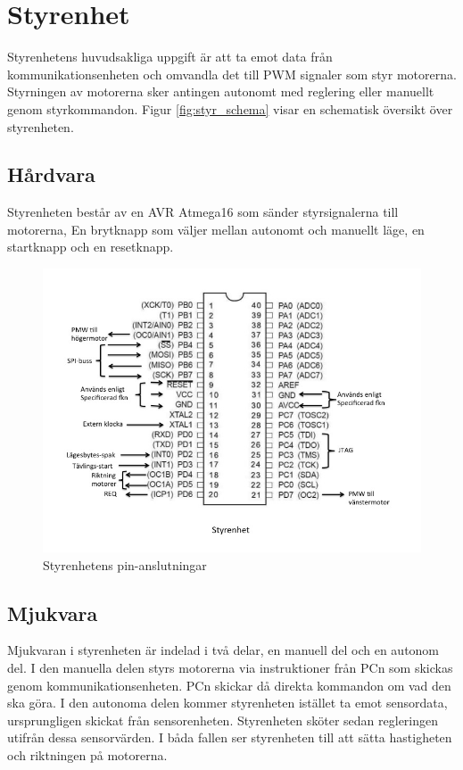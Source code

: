 \section{Styrenhet}

Styrenhetens huvudsakliga uppgift är att ta emot data från
kommunikationsenheten och omvandla det till PWM signaler som styr motorerna.
Styrningen av motorerna sker antingen autonomt med reglering eller 
manuellt genom styrkommandon. Figur \ref{fig:styr_schema} visar en schematisk 
översikt över styrenheten. 


\subsection{Hårdvara}

Styrenheten består av en AVR Atmega16 som sänder styrsignalerna till motorerna, 
En brytknapp som väljer mellan autonomt och manuellt läge, en startknapp och en 
resetknapp.  

\begin{figure}[H]
  \centering
 \includegraphics[angle=0,scale=0.5]{bilder/PIN_styr.jpg}
  \caption{Styrenhetens pin-anslutningar}
  \label{fig:PINstyr}
\end{figure}


\subsection{Mjukvara}

Mjukvaran i styrenheten är indelad i två delar, en manuell del och en autonom del.
I den manuella delen styrs motorerna via instruktioner från PCn som skickas 
genom kommunikationsenheten. PCn skickar då direkta kommandon om vad 
den ska göra. I den autonoma delen kommer styrenheten istället ta emot 
sensordata, ursprungligen skickat från sensorenheten. Styrenheten sköter sedan 
regleringen utifrån dessa sensorvärden. I båda fallen ser styrenheten till att sätta
hastigheten och riktningen på motorerna.

